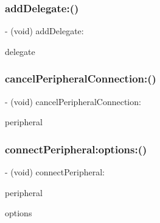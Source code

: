\subsubsection{\texorpdfstring{add\+Delegate\+:()}{addDelegate:()}}
{\footnotesize\ttfamily -\/ (void) add\+Delegate\+: \begin{DoxyParamCaption}\item[{(id$<$ C\+B\+Central\+Manager\+Delegate $>$)}]{delegate }\end{DoxyParamCaption}}

\hypertarget{interfaceARSAL__CentralManager_a9e0a82a9de4683aab71c38aade16a2c2}{}\label{interfaceARSAL__CentralManager_a9e0a82a9de4683aab71c38aade16a2c2} 
\subsubsection{\texorpdfstring{cancel\+Peripheral\+Connection\+:()}{cancelPeripheralConnection:()}}
{\footnotesize\ttfamily -\/ (void) cancel\+Peripheral\+Connection\+: \begin{DoxyParamCaption}\item[{(C\+B\+Peripheral $\ast$)}]{peripheral }\end{DoxyParamCaption}}

\hypertarget{interfaceARSAL__CentralManager_a4902ef59666d20f7964179a184435be8}{}\label{interfaceARSAL__CentralManager_a4902ef59666d20f7964179a184435be8} 
\subsubsection{\texorpdfstring{connect\+Peripheral\+:options\+:()}{connectPeripheral:options:()}}
{\footnotesize\ttfamily -\/ (void) connect\+Peripheral\+: \begin{DoxyParamCaption}\item[{(C\+B\+Peripheral $\ast$)}]{peripheral }\item[{options:(N\+S\+Dictionary $\ast$)}]{options }\end{DoxyParamCaption}}

